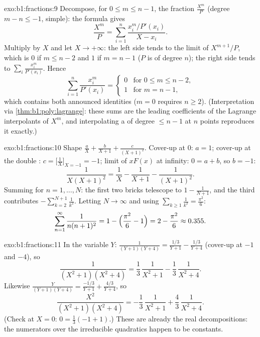 \begin{solution}{exo:b1:fractions:9}
Decompose, for $0 \leq m \leq n - 1$, the fraction $\frac{X^m}{P}$
(degree $m - n \leq -1$,  simple): the  formula gives
\[
\frac{X^m}{P} = \sum_{i=1}^{n} \frac{x_i^m / P'(x_i)}{X - x_i} .
\]
Multiply by $X$ and let $X \to +\infty$: the left side tends to the
limit of $X^{m+1}/P$, which is $0$ if $m \leq n - 2$ and $1$ if $m =
n - 1$ ($P$ is  of degree $n$); the right side tends to
$\sum_i \frac{x_i^m}{P'(x_i)}$. Hence
\[
\sum_{i=1}^{n} \frac{x_i^{m}}{P'(x_i)} =
\begin{cases}
0 & \text{for } 0 \leq m \leq n-2,\\
1 & \text{for } m = n - 1,
\end{cases}
\]
which contains both announced identities ($m = 0$ requires $n \geq
2$). (Interpretation via \cref{thm:b1:poly:lagrange}: these sums are
the leading coefficients of the Lagrange interpolants of $X^m$, and
interpolating a  of degree $\leq n-1$ at $n$ points
reproduces it exactly.)
\end{solution}

\begin{solution}{exo:b1:fractions:10}
Shape $\frac aX + \frac b{X+1} + \frac c{(X+1)^2}$. Cover-up at
$0$: $a = 1$; cover-up at the double : $c = \bigl[\frac1X
\bigr]_{X=-1} = -1$; limit of $xF(x)$ at infinity: $0 = a + b$, so
$b = -1$:
\[
\frac{1}{X(X+1)^2} = \frac1X - \frac1{X+1} - \frac1{(X+1)^2} .
\]
Summing for $n = 1, \dots, N$: the first two bricks telescope to
$1 - \frac1{N+1}$, and the third contributes $-\sum_{k=2}^{N+1}
\frac1{k^2}$. Letting $N \to \infty$ and using $\sum_{k\geq1}
\frac1{k^2} = \frac{\pi^2}6$:
\[
\sum_{n=1}^{\infty}\frac{1}{n(n+1)^2}
= 1 - \Bigl(\frac{\pi^2}6 - 1\Bigr) = 2 - \frac{\pi^2}6
\approx 0.355 .
\]
\end{solution}

\begin{solution}{exo:b1:fractions:11}
In the variable $Y$: $\frac1{(Y+1)(Y+4)} = \frac{1/3}{Y+1} -
\frac{1/3}{Y+4}$ (cover-up at $-1$ and $-4$), so
\[
\frac{1}{(X^2+1)(X^2+4)}
= \frac13\,\frac1{X^2+1} - \frac13\,\frac1{X^2+4} .
\]
Likewise $\frac{Y}{(Y+1)(Y+4)} = \frac{-1/3}{Y+1} +
\frac{4/3}{Y+4}$, so
\[
\frac{X^2}{(X^2+1)(X^2+4)}
= -\frac13\,\frac1{X^2+1} + \frac43\,\frac1{X^2+4} .
\]
(Check at $X = 0$: $0 = \frac13(-1 + 1)$.) These are already the
real decompositions: the numerators over the irreducible quadratics
happen to be constants.
\end{solution}


